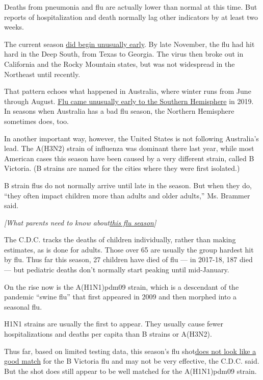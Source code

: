 Deaths from pneumonia and flu are actually lower than normal at this
time. But reports of hospitalization and death normally lag other
indicators by at least two weeks.

The current season
\href{https://time.com/5746409/early-flu-season-2019-2020/}{did begin
unusually early}. By late November, the flu had hit hard in the Deep
South, from Texas to Georgia. The virus then broke out in California and
the Rocky Mountain states, but was not widespread in the Northeast until
recently.

That pattern echoes what happened in Australia, where winter runs from
June through August.
\href{https://www.nytimes3xbfgragh.onion/2019/10/04/health/flu-australia-america.html}{Flu
came unusually early to the Southern Hemisphere} in 2019. In seasons
when Australia has a bad flu season, the Northern Hemisphere sometimes
does, too.

In another important way, however, the United States is not following
Australia's lead. The A(H3N2) strain of influenza was dominant there
last year, while most American cases this season have been caused by a
very different strain, called B Victoria. (B strains are named for the
cities where they were first isolated.)

B strain flus do not normally arrive until late in the season. But when
they do, ``they often impact children more than adults and older
adults,'' Ms. Brammer said.

\emph{{[}What parents need to know
about}\href{https://parenting.nytimes3xbfgragh.onion/childrens-health/flu-season-children}{\emph{this
flu season}}\emph{{]}}

The C.D.C. tracks the deaths of children individually, rather than
making estimates, as is done for adults. Those over 65 are usually the
group hardest hit by flu. Thus far this season, 27 children have died of
flu --- in 2017-18, 187 died --- but pediatric deaths don't normally
start peaking until mid-January.

On the rise now is the A(H1N1)pdm09 strain, which is a descendant of the
pandemic ``swine flu'' that first appeared in 2009 and then morphed into
a seasonal flu.

H1N1 strains are usually the first to appear. They usually cause fewer
hospitalizations and deaths per capita than B strains or A(H3N2).

Thus far, based on limited testing data, this season's flu
shot\href{https://www.cdc.gov/flu/season/faq-flu-season-2019-2020.htm}{does
not look like a good match} for the B Victoria flu and may not be very
effective, the C.D.C. said. But the shot does still appear to be well
matched for the A(H1N1)pdm09 strain.

